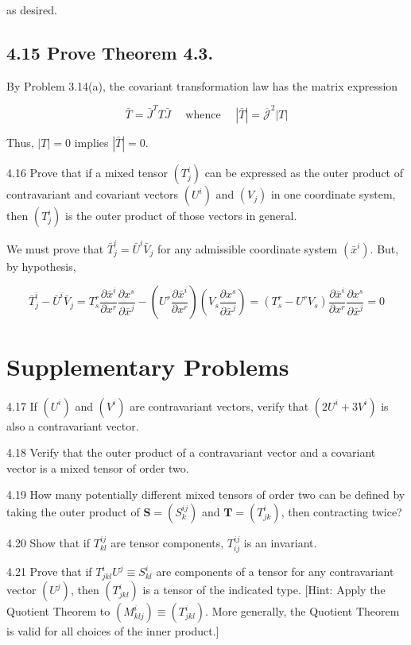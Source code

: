 \documentclass[10pt]{article}
\begin{document}
as desired.

\subsection*{4.15 Prove Theorem 4.3.}
By Problem 3.14(a), the covariant transformation law has the matrix expression

$$
\bar{T}=\bar{J}^{T} T \bar{J} \quad \text { whence } \quad|\bar{T}|=\overline{\mathscr{J}}^{2}|T|
$$

Thus, $|T|=0$ implies $|\bar{T}|=0$.

4.16 Prove that if a mixed tensor $\left(T_{j}^{i}\right)$ can be expressed as the outer product of contravariant and covariant vectors $\left(U^{i}\right)$ and $\left(V_{j}\right)$ in one coordinate system, then $\left(T_{j}^{i}\right)$ is the outer product of those vectors in general.

We must prove that $\bar{T}_{j}^{i}=\bar{U}^{i} \bar{V}_{j}$ for any admissible coordinate system $\left(\bar{x}^{i}\right)$. But, by hypothesis,

$$
\bar{T}_{j}^{i}-\bar{U}^{i} \bar{V}_{j}=T_{s}^{r} \frac{\partial \bar{x}^{i}}{\partial x^{r}} \frac{\partial x^{s}}{\partial \bar{x}^{j}}-\left(U^{r} \frac{\partial \bar{x}^{i}}{\partial x^{r}}\right)\left(V_{s} \frac{\partial x^{s}}{\partial \bar{x}^{j}}\right)=\left(T_{s}^{r}-U^{r} V_{s}\right) \frac{\partial \bar{x}^{i}}{\partial x^{r}} \frac{\partial x^{s}}{\partial \bar{x}^{j}}=0
$$

\section*{Supplementary Problems}
4.17 If $\left(U^{i}\right)$ and $\left(V^{i}\right)$ are contravariant vectors, verify that $\left(2 U^{i}+3 V^{i}\right)$ is also a contravariant vector.

4.18 Verify that the outer product of a contravariant vector and a covariant vector is a mixed tensor of order two.

4.19 How many potentially different mixed tensors of order two can be defined by taking the outer product of $\mathbf{S}=\left(S_{k}^{i j}\right)$ and $\mathbf{T}=\left(T_{j k}^{i}\right)$, then contracting twice?

4.20 Show that if $T_{k l}^{i j}$ are tensor components, $T_{i j}^{i j}$ is an invariant.

4.21 Prove that if $T_{j k l}^{i} U^{j} \equiv S_{k l}^{i}$ are components of a tensor for any contravariant vector $\left(U^{j}\right)$, then $\left(T_{j k l}^{i}\right)$ is a tensor of the indicated type. [Hint: Apply the Quotient Theorem to $\left(M_{k l j}^{i}\right) \equiv\left(T_{j k l}^{i}\right)$. More generally, the Quotient Theorem is valid for all choices of the inner product.]
\end{document}
